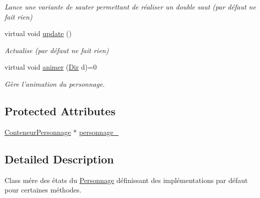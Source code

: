 \begin{DoxyCompactItemize}
\begin{DoxyCompactList}\small\item\em Lance une variante de sauter permettant de réaliser un double saut (par défaut ne fait rien) \end{DoxyCompactList}\item 
\hypertarget{classEtatAnimation_a863e7c027615a8d1f231d948e5c1fd8a}{virtual void \hyperlink{classEtatAnimation_a863e7c027615a8d1f231d948e5c1fd8a}{update} ()}\label{classEtatAnimation_a863e7c027615a8d1f231d948e5c1fd8a}

\begin{DoxyCompactList}\small\item\em Actualise (par défaut ne fait rien) \end{DoxyCompactList}\item 
\hypertarget{classEtatAnimation_a09e0277b2679249f33e6b95047cb9378}{virtual void \hyperlink{classEtatAnimation_a09e0277b2679249f33e6b95047cb9378}{animer} (\hyperlink{Espace_8h_a7cf6e8c5a5bc5e7b2afef3647870b1c4}{Dir} d)=0}\label{classEtatAnimation_a09e0277b2679249f33e6b95047cb9378}

\begin{DoxyCompactList}\small\item\em Gère l'animation du personnage. \end{DoxyCompactList}\end{DoxyCompactItemize}
\subsection*{Protected Attributes}
\begin{DoxyCompactItemize}
\item 
\hyperlink{classConteneurPersonnage}{Conteneur\-Personnage} $\ast$ \hyperlink{classEtatAnimation_a641039e3ede2475fa1f98fa6ffbe8a7a}{personnage\-\_\-}
\end{DoxyCompactItemize}


\subsection{Detailed Description}
Class mére des états du \hyperlink{classPersonnage}{Personnage} définissant des implémentations par défaut pour certaines méthodes. 

